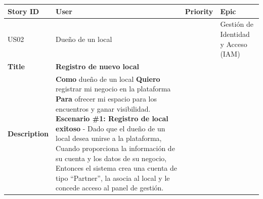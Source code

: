 {\def\LTcaptype{none} %
\begin{longtable}[]{@{}
  >{\raggedright\arraybackslash}p{}
  >{\raggedright\arraybackslash}p{}
  >{\raggedright\arraybackslash}p{}
  >{\raggedright\arraybackslash}p{}@{}}
\toprule\noalign{}
\begin{minipage}[b]{\linewidth}\raggedright
Story ID
\end{minipage} & \begin{minipage}[b]{\linewidth}\raggedright
User
\end{minipage} & \begin{minipage}[b]{\linewidth}\raggedright
Priority
\end{minipage} & \begin{minipage}[b]{\linewidth}\raggedright
Epic
\end{minipage} \\
\midrule\noalign{}
\endhead
\bottomrule\noalign{}
\endlastfoot
US02 & Dueño de un local & 5 & Gestión de Identidad y Acceso (IAM) \\
\textbf{Title} & \textbf{Registro de nuevo local} & & \\
\textbf{Description} & \textbf{Como} dueño de un local \textbf{Quiero}
registrar mi negocio en la plataforma \textbf{Para} ofrecer mi espacio
para los encuentros y ganar visibilidad. \textbf{Escenario \#1: Registro
de local exitoso} - Dado que el dueño de un local desea unirse a la
plataforma, Cuando proporciona la información de su cuenta y los datos
de su negocio, Entonces el sistema crea una cuenta de tipo ``Partner'',
la asocia al local y le concede acceso al panel de gestión. & & \\
\end{longtable}
}

